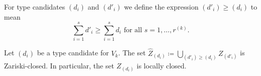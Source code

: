 \begin{definition}
	For type candidates $(d_i)$ and $(d'_i)$ we define the expression $(d'_i) \geq (d_i)$ to mean
	\[
		\sum_{i=1}^s d'_i \geq \sum_{i=1}^s d_i \text{ for all $s=1,\dotsc, r^{(k)}$}.
	\]
\end{definition}



\begin{proposition}
	Let $(d_i)$ be a type candidate for $V_k$. The set $\widehat Z_{(d_i)} \coloneqq \bigcup_{(d'_i)\geq(d_i)} Z_{(d'_i)}$ is Zariski-closed. In particular, the set $Z_{(d_i)}$ is locally closed.
\end{proposition}

